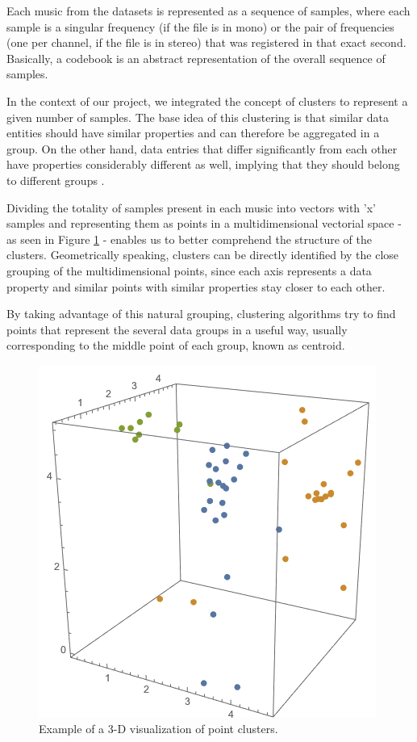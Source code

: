 \documentclass[12pt]{article}
\begin{document}
Each music from the datasets is represented as a sequence of samples, where each 
sample is a singular frequency (if the file is in mono) or the pair of frequencies 
(one per channel, if the file is in stereo) that was registered in that exact second.
Basically, a codebook is an abstract representation of the overall 
sequence of samples.

In the context of our project, we integrated the concept of clusters to represent 
a given number of samples.
The base idea of this clustering is that similar data entities should have similar 
properties and can therefore be aggregated in a group.
On the other hand, data entries that differ significantly from each other
have properties considerably different as well, implying that they should belong 
to different groups \cite{clustering}. 

\newpage
Dividing the totality of samples present in each music into vectors with 'x' 
samples and representing them as points in a multidimensional vectorial space -  
as seen in Figure \ref{fig:pointsEx} - enables us to better comprehend the 
structure of the clusters.  
Geometrically speaking, clusters can be directly identified by the close 
grouping of the multidimensional points, since each axis represents a data 
property and similar points with similar properties stay closer to each other. 

By taking advantage of this natural grouping, clustering algorithms try to find 
points that represent the several data groups in a useful way, usually 
corresponding to the middle point of each group, known as centroid.

\begin{figure}[H]
  \centering
  \begin{minipage}{\textwidth}
    \centering
    \includegraphics[width=0.4\linewidth]{pointsEx.png}
  \end{minipage}%
  \caption{Example of a 3-D visualization of point clusters.}
  \label{fig:pointsEx}
\end{figure}
\end{document}
